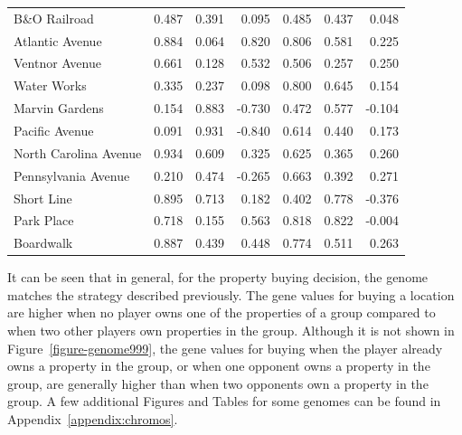 \begin{table}[htbp]
{\begin{tabular}{lrrr|rrr}
    B\&O Railroad & 0.487  & 0.391  & 0.095  & 0.485  & 0.437  & 0.048 \\
    Atlantic Avenue & 0.884  & 0.064  & 0.820  & 0.806  & 0.581  & 0.225 \\
    Ventnor Avenue & 0.661  & 0.128  & 0.532  & 0.506  & 0.257  & 0.250 \\
    Water Works & 0.335  & 0.237  & 0.098  & 0.800  & 0.645  & 0.154 \\
    Marvin Gardens & 0.154  & 0.883  & -0.730 & 0.472  & 0.577  & -0.104 \\
    Pacific Avenue & 0.091  & 0.931  & -0.840 & 0.614  & 0.440  & 0.173 \\
    North Carolina Avenue & 0.934  & 0.609  & 0.325  & 0.625  & 0.365  & 0.260 \\
    Pennsylvania Avenue & 0.210  & 0.474  & -0.265 & 0.663  & 0.392  & 0.271 \\
    Short Line & 0.895  & 0.713  & 0.182  & 0.402  & 0.778  & -0.376 \\
    Park Place & 0.718  & 0.155  & 0.563  & 0.818  & 0.822  & -0.004 \\
    Boardwalk & 0.887  & 0.439  & 0.448  & 0.774  & 0.511  & 0.263 \\
    \bottomrule
    \end{tabular}}
  \label{tab:chromo_compare}%
\end{table}%

It can be seen that in general, for the property buying decision, the genome
matches the strategy described previously. The gene values for buying a location
are higher when no player owns one of the properties of a group compared to when
two other players own properties in the group. Although it is not shown in
Figure~\ref{figure-genome999}, the gene values for buying when the player
already owns a property in the group, or when one opponent owns a property in
the group, are generally higher than when two opponents own a property in the
group. A few additional Figures and Tables for some genomes can be found in
Appendix~\ref{appendix:chromos}.

